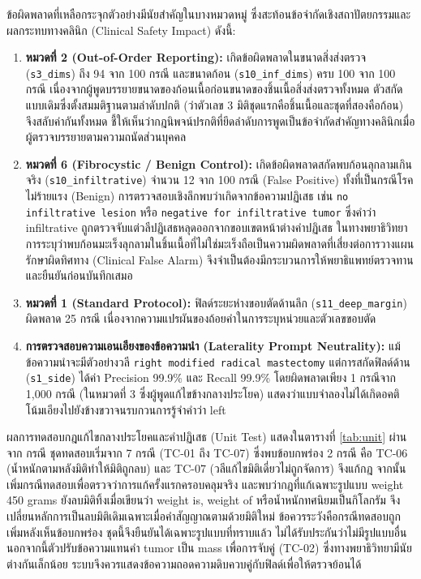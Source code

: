 

ข้อผิดพลาดที่เหลือกระจุกตัวอย่างมีนัยสำคัญในบางหมวดหมู่ ซึ่งสะท้อนข้อจำกัดเชิงสถาปัตยกรรมและผลกระทบทางคลินิก (Clinical Safety Impact) ดังนี้:
\begin{enumerate}
    \item \textbf{หมวดที่ 2 (Out-of-Order Reporting):} เกิดข้อผิดพลาดในขนาดสิ่งส่งตรวจ (\texttt{s3\_dims}) ถึง 94 จาก 100 กรณี และขนาดก้อน (\texttt{s10\_inf\_dims}) ครบ 100 จาก 100 กรณี เนื่องจากผู้พูดบรรยายขนาดของก้อนเนื้อก่อนขนาดของชิ้นเนื้อสิ่งส่งตรวจทั้งหมด ตัวสกัดแบบเดิมซึ่งตั้งสมมติฐานตามลำดับปกติ (ว่าตัวเลข 3 มิติชุดแรกคือชิ้นเนื้อและชุดที่สองคือก้อน) จึงสลับค่ากันทั้งหมด ชี้ให้เห็นว่ากฎนิพจน์ปรกติที่ยึดลำดับการพูดเป็นข้อจำกัดสำคัญทางคลินิกเมื่อผู้ตรวจบรรยายตามความถนัดส่วนบุคคล
    \item \textbf{หมวดที่ 6 (Fibrocystic / Benign Control):} เกิดข้อผิดพลาดสกัดพบก้อนลุกลามเกินจริง (\texttt{s10\_infiltrative}) จำนวน 12 จาก 100 กรณี (False Positive) ทั้งที่เป็นกรณีโรคไม่ร้ายแรง (Benign) การตรวจสอบเชิงลึกพบว่าเกิดจากข้อความปฏิเสธ เช่น \texttt{no infiltrative lesion} หรือ \texttt{negative for infiltrative tumor} ซึ่งคำว่า infiltrative ถูกตรวจจับแต่วลีปฏิเสธหลุดออกจากขอบเขตหน้าต่างคำปฏิเสธ ในทางพยาธิวิทยา การระบุว่าพบก้อนมะเร็งลุกลามในชิ้นเนื้อที่ไม่ใช่มะเร็งถือเป็นความผิดพลาดที่เสี่ยงต่อการวางแผนรักษาผิดทิศทาง (Clinical False Alarm) จึงจำเป็นต้องมีกระบวนการให้พยาธิแพทย์ตรวจทานและยืนยันก่อนบันทึกเสมอ
    \item \textbf{หมวดที่ 1 (Standard Protocol):} ฟิลด์ระยะห่างขอบตัดด้านลึก (\texttt{s11\_deep\_margin}) ผิดพลาด 25 กรณี เนื่องจากความแปรผันของถ้อยคำในการระบุหน่วยและตัวเลขขอบตัด
    \item \textbf{การตรวจสอบความเอนเอียงของข้อความนำ (Laterality Prompt Neutrality):} แม้ข้อความนำจะมีตัวอย่างวลี \texttt{right modified radical mastectomy} แต่การสกัดฟิลด์ด้าน (\texttt{s1\_side}) ได้ค่า Precision 99.9\% และ Recall 99.9\% โดยผิดพลาดเพียง 1 กรณีจาก 1,000 กรณี (ในหมวดที่ 3 ซึ่งผู้พูดแก้ไขข้างกลางประโยค) แสดงว่าแบบจำลองไม่ได้เกิดอคติโน้มเอียงไปยังข้างขวาจนรบกวนการรู้จำคำว่า left
\end{enumerate}

ผลการทดสอบกฎแก้ไขกลางประโยคและคำปฏิเสธ (Unit Test) แสดงในตารางที่ \ref{tab:unit} ผ่าน \unitPass{} จาก \unitTotal{} กรณี ชุดทดสอบเริ่มจาก 7 กรณี (TC-01 ถึง TC-07) ซึ่งพบข้อบกพร่อง 2 กรณี คือ TC-06 (น้ำหนักตามหลังมิติทำให้มิติถูกลบ) และ TC-07 (วลีแก้ไขมิติเดี่ยวไม่ถูกจัดการ) จึงแก้กฎ จากนั้นเพิ่มกรณีทดสอบเพื่อตรวจว่าการแก้ครั้งแรกครอบคลุมจริง และพบว่ากฎที่แก้เฉพาะรูปแบบ weight 450 grams ยังลบมิติทิ้งเมื่อเขียนว่า weight is, weight of หรือน้ำหนักทศนิยมเป็นกิโลกรัม จึงเปลี่ยนหลักการเป็นลบมิติเดิมเฉพาะเมื่อคำสัญญาณตามด้วยมิติใหม่ ข้อควรระวังคือกรณีทดสอบถูกเพิ่มหลังเห็นข้อบกพร่อง ชุดนี้จึงยืนยันได้เฉพาะรูปแบบที่ทราบแล้ว ไม่ได้รับประกันว่าไม่มีรูปแบบอื่น นอกจากนี้ตัวปรับข้อความแทนคำ tumor เป็น mass เพื่อการจับคู่ (TC-02) ซึ่งทางพยาธิวิทยามีนัยต่างกันเล็กน้อย ระบบจึงควรแสดงข้อความถอดความดิบควบคู่กับฟิลด์เพื่อให้ตรวจย้อนได้

